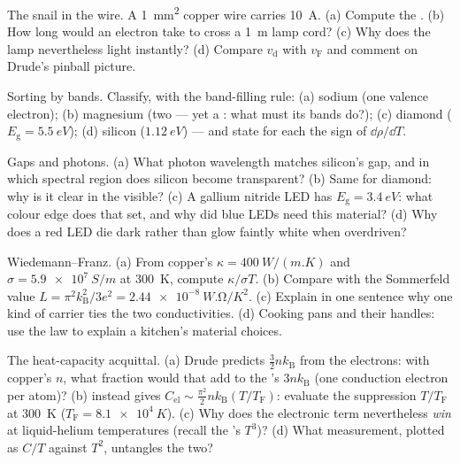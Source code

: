 \begin{exercise}[$\star$]\label{exo:b3:electrons-in-solids:2}
The snail in the wire. A \qty{1}{mm^2} copper wire carries
\qty{10}{A}. (a) Compute the . (b) How long would
an electron take to cross a \qty{1}{m} lamp cord? (c) Why does
the lamp nevertheless light instantly? (d) Compare
$v_{\text{d}}$ with $v_{\text{F}}$ and comment on Drude's
pinball picture.
\end{exercise}

\begin{exercise}[$\star$]\label{exo:b3:electrons-in-solids:3}
Sorting by bands. Classify, with the band-filling rule: (a)
sodium (one valence electron); (b) magnesium (two --- yet a
: what must its bands do?); (c) diamond
($E_{\text{g}} = \qty{5.5}{eV}$); (d) silicon
($\qty{1.12}{eV}$) --- and state for each the sign of
$\dd\rho/\dd T$.
\end{exercise}

\begin{exercise}[$\star$]\label{exo:b3:electrons-in-solids:4}
Gaps and photons. (a) What photon wavelength matches silicon's
gap, and in which spectral region does silicon become
transparent? (b) Same for diamond: why is it clear in the
visible? (c) A gallium nitride LED has $E_{\text{g}} =
\qty{3.4}{eV}$: what colour edge does that set, and why did blue
LEDs need this material? (d) Why does a red LED die dark rather
than glow faintly white when overdriven?
\end{exercise}

\begin{exercise}[$\star\star$]\label{exo:b3:electrons-in-solids:5}
Wiedemann--Franz. (a) From copper's $\kappa =
\qty{400}{W/(m.K)}$ and $\sigma = \qty{5.9e7}{S/m}$ at
\qty{300}{K}, compute $\kappa/\sigma T$. (b) Compare with the
Sommerfeld value $L = \pi^2k_{\text{B}}^2/3e^2 =
\qty{2.44e-8}{W.\ohm/K^2}$. (c) Explain in one sentence why one
kind of carrier ties the two conductivities. (d) Cooking pans
and their handles: use the law to explain a kitchen's material
choices.
\end{exercise}

\begin{exercise}[$\star\star$]\label{exo:b3:electrons-in-solids:6}
The heat-capacity acquittal. (a) Drude predicts
$\tfrac32nk_{\text{B}}$ from the electrons: with copper's $n$,
what fraction would that add to the 's
$3nk_{\text{B}}$ (one conduction electron per atom)? (b)
 instead gives $C_{\text{el}}
\sim \tfrac{\pi^2}{2}nk_{\text{B}}(T/T_{\text{F}})$: evaluate the
suppression $T/T_{\text{F}}$ at \qty{300}{K}
($T_{\text{F}} = \qty{8.1e4}{K}$). (c) Why does the electronic
term nevertheless \emph{win} at liquid-helium temperatures
(recall the 's $T^3$)? (d) What measurement, plotted as
$C/T$ against $T^2$, untangles the two?
\end{exercise}

